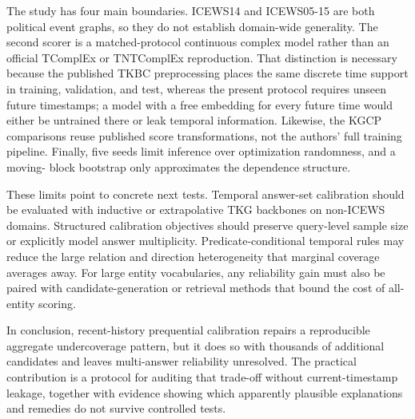 \documentclass[information,article,submit,oneauthor,pdftex]{Definitions/mdpi}
\begin{document}
The study has four main boundaries. ICEWS14 and ICEWS05-15 are both political
event graphs, so they do not establish domain-wide generality. The second
scorer is a matched-protocol continuous complex model rather than an official
TComplEx or TNTComplEx reproduction. That distinction is necessary because the
published TKBC preprocessing places the same discrete time support in training,
validation, and test, whereas the present protocol requires unseen future
timestamps; a model with a free embedding for every future time would either be
untrained there or leak temporal information. Likewise, the KGCP comparisons
reuse published score transformations, not the authors' full training pipeline.
Finally, five seeds limit inference over optimization randomness, and a moving-
block bootstrap only approximates the dependence structure.

These limits point to concrete next tests. Temporal answer-set calibration
should be evaluated with inductive or extrapolative TKG backbones on non-ICEWS
domains. Structured calibration objectives should preserve query-level sample
size or explicitly model answer multiplicity. Predicate-conditional temporal
rules may reduce the large relation and direction heterogeneity that marginal
coverage averages away. For large entity vocabularies, any reliability gain
must also be paired with candidate-generation or retrieval methods that bound
the cost of all-entity scoring.

In conclusion, recent-history prequential calibration repairs a reproducible
aggregate undercoverage pattern, but it does so with thousands of additional
candidates and leaves multi-answer reliability unresolved. The practical
contribution is a protocol for auditing that trade-off without current-timestamp
leakage, together with evidence showing which apparently plausible explanations
and remedies do not survive controlled tests.



\end{document}
